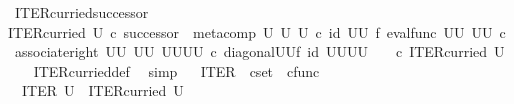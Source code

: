 \begin{isabellebody}
%
\isadelimproof
\isanewline
%
\endisadelimproof
\isanewline
{}\isamarkupfalse%
\ ITER{\isacharunderscore}{\kern0pt}curried{\isacharunderscore}{\kern0pt}successor{\isacharcolon}{\kern0pt}\isanewline
{\isachardoublequoteopen}ITER{\isacharunderscore}{\kern0pt}curried\ U\ {\isasymcirc}\isactrlsub c\ successor\ {\isacharequal}{\kern0pt}\ {\isacharparenleft}{\kern0pt}meta{\isacharunderscore}{\kern0pt}comp\ U\ U\ U\ {\isasymcirc}\isactrlsub c\ {\isacharparenleft}{\kern0pt}id\ {\isacharparenleft}{\kern0pt}U\isactrlbsup U\isactrlesup {\isacharparenright}{\kern0pt}\ {\isasymtimes}\isactrlsub f\ eval{\isacharunderscore}{\kern0pt}func\ {\isacharparenleft}{\kern0pt}U\isactrlbsup U\isactrlesup {\isacharparenright}{\kern0pt}\ {\isacharparenleft}{\kern0pt}U\isactrlbsup U\isactrlesup {\isacharparenright}{\kern0pt}{\isacharparenright}{\kern0pt}\ {\isasymcirc}\isactrlsub c\ {\isacharparenleft}{\kern0pt}associate{\isacharunderscore}{\kern0pt}right\ {\isacharparenleft}{\kern0pt}U\isactrlbsup U\isactrlesup {\isacharparenright}{\kern0pt}\ {\isacharparenleft}{\kern0pt}U\isactrlbsup U\isactrlesup {\isacharparenright}{\kern0pt}\ {\isacharparenleft}{\kern0pt}{\isacharparenleft}{\kern0pt}U\isactrlbsup U\isactrlesup {\isacharparenright}{\kern0pt}\isactrlbsup U\isactrlbsup U\isactrlesup \isactrlesup {\isacharparenright}{\kern0pt}{\isacharparenright}{\kern0pt}\ {\isasymcirc}\isactrlsub c\ {\isacharparenleft}{\kern0pt}diagonal{\isacharparenleft}{\kern0pt}U\isactrlbsup U\isactrlesup {\isacharparenright}{\kern0pt}{\isasymtimes}\isactrlsub f\ id\ {\isacharparenleft}{\kern0pt}{\isacharparenleft}{\kern0pt}U\isactrlbsup U\isactrlesup {\isacharparenright}{\kern0pt}\isactrlbsup U\isactrlbsup U\isactrlesup \isactrlesup {\isacharparenright}{\kern0pt}{\isacharparenright}{\kern0pt}{\isacharparenright}{\kern0pt}\isactrlsup {\isasymsharp}\ \ \ \ {\isasymcirc}\isactrlsub c\ ITER{\isacharunderscore}{\kern0pt}curried\ U{\isachardoublequoteclose}\isanewline
%
\isadelimproof
\ \ %
\endisadelimproof
%
\isatagproof
{}\isamarkupfalse%
\ ITER{\isacharunderscore}{\kern0pt}curried{\isacharunderscore}{\kern0pt}def{}\ \isamarkupfalse%
\ simp%
\endisatagproof
{\isafoldproof}%
%
\isadelimproof
\ \isanewline
%
\endisadelimproof
\isanewline
{}\isamarkupfalse%
\ ITER\ {\isacharcolon}{\kern0pt}{\isacharcolon}{\kern0pt}\ {\isachardoublequoteopen}cset\ {\isasymRightarrow}\ cfunc{\isachardoublequoteclose}\ \ \isanewline
\ \ {\isachardoublequoteopen}ITER\ U\ {\isacharequal}{\kern0pt}\ {\isacharparenleft}{\kern0pt}ITER{\isacharunderscore}{\kern0pt}curried\ U{\isacharparenright}{\kern0pt}\isactrlsup {\isasymflat}{\isachardoublequoteclose}\isanewline

\end{isabellebody}

